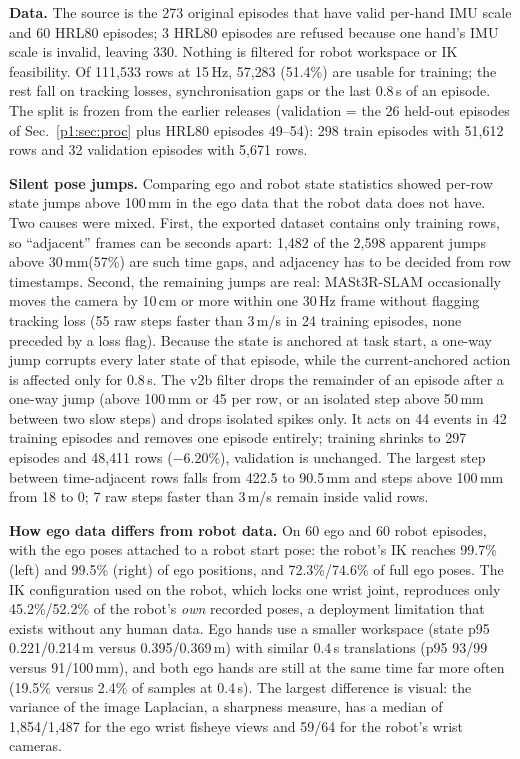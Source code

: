 \documentclass[conference,10pt]{IEEEtran}
\newcommand{\mm}{\,mm\xspace}
\begin{document}
\textbf{Data.} The source is the 273 original episodes that have valid per-hand IMU scale and 60 HRL80 episodes; 3 HRL80 episodes
are refused because one hand's IMU scale is invalid, leaving 330. Nothing is filtered for robot workspace or IK feasibility.
Of 111{,}533 rows at 15\,Hz, 57{,}283 (51.4\%) are usable for training; the rest fall on tracking losses, synchronisation gaps
or the last 0.8\,s of an episode. The split is frozen from the earlier releases (validation = the 26 held-out episodes of
Sec.~\ref{p1:sec:proc} plus HRL80 episodes 49--54): 298 train episodes with 51{,}612 rows and 32 validation episodes with 5{,}671 rows.

\textbf{Silent pose jumps.} Comparing ego and robot state statistics showed per-row state jumps above 100\mm in the ego data
that the robot data does not have. Two causes were mixed. First, the exported dataset contains only training rows, so
``adjacent'' frames can be seconds apart: 1{,}482 of the 2{,}598 apparent jumps above 30\mm (57\%) are such time gaps, and
adjacency has to be decided from row timestamps. Second, the remaining jumps are real: MASt3R-SLAM occasionally moves the
camera by 10\,cm or more within one 30\,Hz frame without flagging tracking loss (55 raw steps faster than 3\,m/s in 24 training
episodes, none preceded by a loss flag). Because the state is anchored at task start, a one-way jump corrupts every later
state of that episode, while the current-anchored action is affected only for 0.8\,s. The v2b filter drops the remainder of an
episode after a one-way jump (above 100\mm or 45\textdegree{} per row, or an isolated step above 50\mm between two slow steps)
and drops isolated spikes only. It acts on 44 events in 42 training episodes and removes one episode entirely; training
shrinks to 297 episodes and 48{,}411 rows ($-6.20$\%), validation is unchanged. The largest step between time-adjacent rows
falls from 422.5 to 90.5\mm and steps above 100\mm from 18 to 0; 7 raw steps faster than 3\,m/s remain inside valid rows.

\textbf{How ego data differs from robot data.} On 60 ego and 60 robot episodes, with the ego poses attached to a robot start
pose: the robot's IK reaches 99.7\% (left) and 99.5\% (right) of ego positions, and 72.3\%/74.6\% of full ego poses. The IK
configuration used on the robot, which locks one wrist joint, reproduces only 45.2\%/52.2\% of the robot's \emph{own} recorded
poses, a deployment limitation that exists without any human data. Ego hands use a smaller workspace (state p95 0.221/0.214\,m
versus 0.395/0.369\,m) with similar 0.4\,s translations (p95 93/99 versus 91/100\mm), and both ego hands are still at the same
time far more often (19.5\% versus 2.4\% of samples at 0.4\,s). The largest difference is visual: the variance of the image
Laplacian, a sharpness measure, has a median of 1{,}854/1{,}487 for the ego wrist fisheye views and 59/64 for the robot's wrist
cameras.
\end{document}
